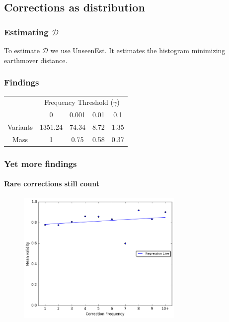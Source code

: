 \documentclass{beamer}
\begin{document}
\subsection{Corrections as distribution}
\begin{frame}
	\frametitle{Estimating $\mathcal{D}$}
	To estimate $\mathcal{D}$ we use UnseenEst.
	It estimates the histogram minimizing earthmover distance.
\end{frame}
\begin{frame}[label=Dists]
	\frametitle{Findings}
	\begin{table}[h!]
		\begin{tabular}{c|c|c|c|c|}
			& \multicolumn{4}{c|}{Frequency Threshold ($\gamma$)}\\ 
			& \multicolumn{1}{c}{0} & \multicolumn{1}{c}{0.001} & \multicolumn{1}{c}{0.01} & \multicolumn{1}{c|}{0.1}
			\\
			\hline
			Variants & 1351.24 & 74.34 & 8.72 & 1.35
			\\
			Mass & 1 & 0.75 & 0.58 & 0.37\\
			\hline
		\end{tabular}
	\end{table}\hyperlink{alldists}{}
\end{frame}
\begin{frame}
	\frametitle{Yet more findings}
	\framesubtitle{Rare corrections still count}
	\begin{figure}
		\includegraphics[width=8cm]{IAA_confirmation_frequency}
	\end{figure}
\end{frame}
\end{document}
